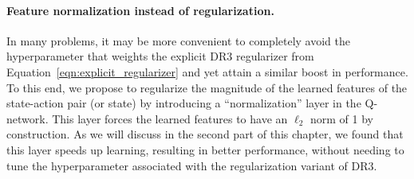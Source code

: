 \paragraph{Feature normalization instead of regularization.} In many problems, it may be more convenient to completely avoid the hyperparameter that weights the explicit DR3 regularizer from Equation~\ref{eqn:explicit_regularizer} and yet attain a similar boost in performance. To this end, we propose to regularize the magnitude of the learned features of the state-action pair (or state) by introducing a ``normalization'' layer in the Q-network. This layer forces the learned features to have an $\ell_2$ norm of 1 by construction. As we will discuss in the second part of this chapter, we found that this layer speeds up learning, resulting in better performance, without needing to tune the hyperparameter associated with the regularization variant of DR3.    





